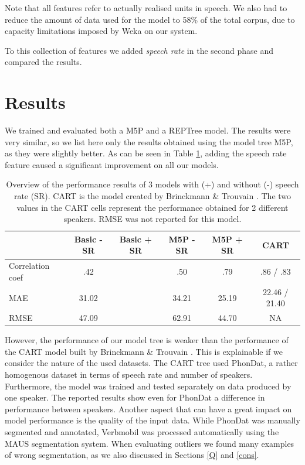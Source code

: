 \documentclass[11pt,a4paper]{scrbook}
\begin{document}
Note that all features refer to actually realised units in speech. We also had to reduce the amount of data used for the model to 58\% of the total corpus, due to capacity limitations imposed by Weka on our system. 

To this collection of features we added \textit{speech rate} in the second phase and compared the results. 

\section{Results}
\label{chap_6:results}
We trained and evaluated both a M5P and a REPTree model. The results were very similar, so we list here only the results obtained using the model tree M5P, as they were slightly better. As can be seen in Table \ref{tab:perfM}, adding the speech rate feature caused a significant improvement on all our models. 

\begin{table}[htbp]
\centering
\begin{tabular}{|l|c|c|c|c|c|}

\hline
	 & Basic - SR & Basic + SR & M5P - SR & M5P + SR & CART\\
\hline
\hline
Correlation coef 		& .42  &  & .50 & .79 & .86 / .83\\
	\hline
MAE  &  31.02 & & 34.21 & 25.19 & 22.46 / 21.40\\
	\hline
RMSE  &  47.09 & & 62.91 & 44.70 & NA \\
	\hline
\end{tabular}
\vspace{4mm}
\caption{Overview of the performance results of 3 models with (+) and without (-) speech rate (SR). CART is the model created by Brinckmann \& Trouvain \cite{Brinckmann_2003}. The two values in the CART cells represent the performance obtained for 2 different speakers. RMSE was not reported for this model.} 
\label{tab:perfM}
\end{table}

However, the performance of our model tree is weaker than the performance of the CART model built by Brinckmann \& Trouvain \cite{Brinckmann_2003}. This is explainable if we consider the nature of the used datasets. The CART tree used PhonDat, a rather homogenous dataset in terms of speech rate and number of speakers. Furthermore, the model was trained and tested separately on data produced by one speaker. The reported results show even for PhonDat a difference in performance between speakers. Another aspect that can have a great impact on model performance is the quality of the input data. While PhonDat was manually segmented and annotated, Verbmobil was processed automatically using the MAUS segmentation system. When evaluating outliers we found many examples of wrong segmentation, as we also discussed in Sections \ref{Q} and \ref{cons}.
\end{document}
